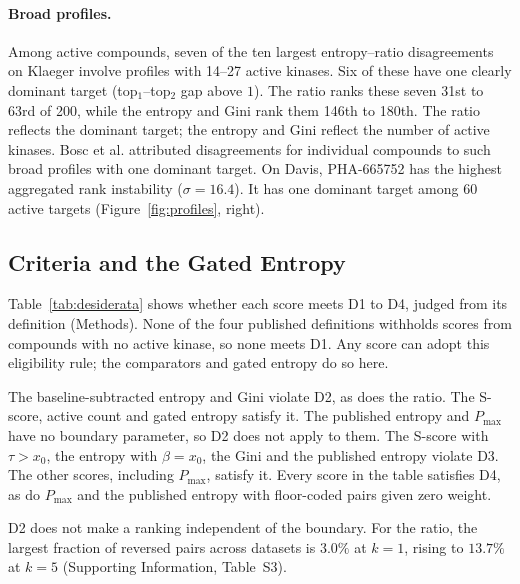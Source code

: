 \paragraph{Broad profiles.} Among active compounds, seven of the ten largest
entropy--ratio disagreements on Klaeger involve profiles with 14--27 active
kinases. Six of these have one clearly dominant target (top$_1$--top$_2$
gap above $1$). The ratio ranks these seven 31st to 63rd of 200, while the
entropy and Gini rank them 146th to 180th. The ratio reflects the dominant
target; the entropy and Gini reflect the number of active kinases.
Bosc et al.\cite{Bosc2017} attributed disagreements for individual compounds
to such broad profiles with one dominant target. On Davis, PHA-665752 has
the highest aggregated rank instability ($\sigma = 16.4$). It has one
dominant target among 60 active targets (Figure~\ref{fig:profiles}, right).

\subsection{Criteria and the Gated Entropy}
\label{sec:desiderata}

Table~\ref{tab:desiderata} shows whether each score meets D1 to D4, judged
from its definition (Methods). None of the four published definitions
withholds scores from compounds with no active kinase, so none meets D1.
Any score can adopt this eligibility rule; the comparators and gated entropy
do so here.

The baseline-subtracted entropy and Gini violate D2, as does the ratio.
The S-score, active count and gated entropy satisfy it.
The published entropy and $P_{\max}$ have no boundary parameter, so D2 does
not apply to them. The S-score with $\tau > x_0$, the entropy with
$\beta = x_0$, the Gini and the published entropy violate D3. The other
scores, including $P_{\max}$, satisfy it. Every score in the table satisfies
D4, as do $P_{\max}$ and the published entropy with floor-coded pairs given
zero weight.

D2 does not make a ranking independent of the boundary. For the ratio, the
largest fraction of reversed pairs across datasets is $3.0\%$ at $k = 1$,
rising to $13.7\%$ at $k = 5$
(Supporting Information, Table~S3).


